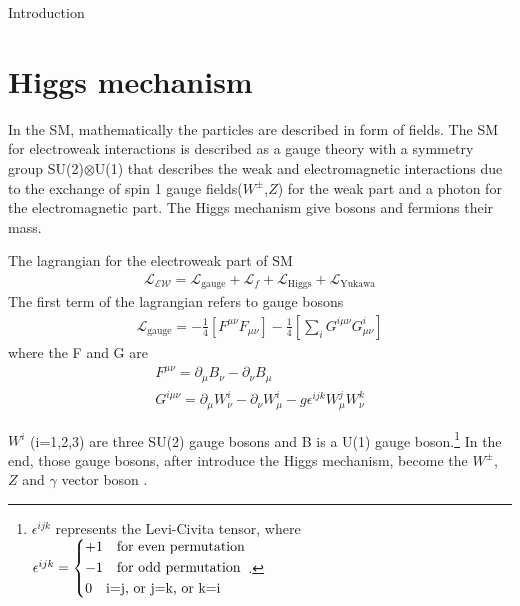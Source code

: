 \begin{chapter}{Introduction}
\pagebreak



\section{Higgs mechanism}
In the SM, mathematically the particles are described in form of fields. The SM for electroweak interactions is described as a gauge theory with a symmetry group SU(2)$\otimes$U(1)
that describes the weak and electromagnetic interactions
due to the exchange of spin 1 gauge fields($W^{\pm}$,$Z$) for the weak part and a photon for the electromagnetic part. The Higgs mechanism give bosons and fermions their mass. 

The lagrangian for the electroweak part of SM
\begin{align}\label{sml}
\mathcal{L_{\text{EW}}}=\mathcal{L}_\text{gauge}+\mathcal{L}_f +\mathcal{L}_\text{Higgs} + \mathcal{L}_\text{Yukawa}
\end{align}
The first term of the lagrangian refers to gauge bosons 
 \begin{align}\label{smg}
 \mathcal{L}_\text{gauge}=-\frac{1}{4}\left[F^{\mu\nu}F_{\mu\nu}\right]-\frac{1}{4}\left[\sum_{i}G^{i\mu\nu}G^i_{\mu\nu}\right]
 \end{align}
where the F and G are 
\begin{align}
F^{\mu \nu}=\partial_\mu B_\nu -\partial_\nu B_\mu \\
G^{i\mu\nu}=\partial_\mu W^i_\nu -\partial_\nu W^i_\mu -g\epsilon^{ijk}W^j_\mu W^k_\nu 
\end{align}

$W^i$ (i=1,2,3) are three SU(2) gauge bosons and B is a U(1) gauge boson.\footnote{$\epsilon^{ijk}$ represents the Levi-Civita tensor, where $\epsilon^{ijk}= \begin{dcases}
	+1 \quad \text{for even permutation} \\
	-1 \quad \text{for odd permutation}\\
	0 \quad \text{i=j, or j=k, or k=i } 
	\end{dcases}$.} In the end, those gauge bosons, after introduce the Higgs mechanism, become the $W^\pm$, $Z$ and $\gamma$ vector boson
\cite{ew1}\cite{ew2}. %
\\


\end{chapter}
